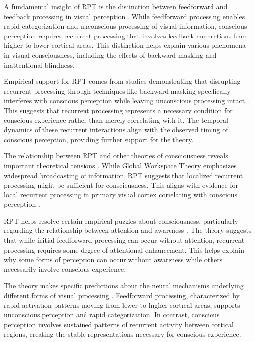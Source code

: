 \begin{refsection}
A fundamental insight of RPT is the distinction between feedforward and feedback processing in visual perception \cite{Lamme2000}. While feedforward processing enables rapid categorization and unconscious processing of visual information, conscious perception requires recurrent processing that involves feedback connections from higher to lower cortical areas. This distinction helps explain various phenomena in visual consciousness, including the effects of backward masking and inattentional blindness.

Empirical support for RPT comes from studies demonstrating that disrupting recurrent processing through techniques like backward masking specifically interferes with conscious perception while leaving unconscious processing intact \cite{Fahrenfort2007}. This suggests that recurrent processing represents a necessary condition for conscious experience rather than merely correlating with it. The temporal dynamics of these recurrent interactions align with the observed timing of conscious perception, providing further support for the theory.

The relationship between RPT and other theories of consciousness reveals important theoretical tensions \cite{Montemayor2019}. While Global Workspace Theory emphasizes widespread broadcasting of information, RPT suggests that localized recurrent processing might be sufficient for consciousness. This aligns with evidence for local recurrent processing in primary visual cortex correlating with conscious perception \cite{Super2001}.

RPT helps resolve certain empirical puzzles about consciousness, particularly regarding the relationship between attention and awareness \cite{Block2007}. The theory suggests that while initial feedforward processing can occur without attention, recurrent processing requires some degree of attentional enhancement. This helps explain why some forms of perception can occur without awareness while others necessarily involve conscious experience.

The theory makes specific predictions about the neural mechanisms underlying different forms of visual processing \cite{Dehaene2006}. Feedforward processing, characterized by rapid activation patterns moving from lower to higher cortical areas, supports unconscious perception and rapid categorization. In contrast, conscious perception involves sustained patterns of recurrent activity between cortical regions, creating the stable representations necessary for conscious experience.


\end{refsection}
